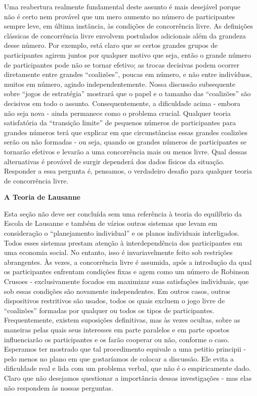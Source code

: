 \documentclass[a4paper,12pt]{article}[abntex2]
\begin{document}
Uma reabertura realmente fundamental deste assunto é mais desejável porque não é certo nem provável que um mero aumento no número de participantes sempre leve, em última instância, às condições de concorrência livre. As definições clássicas de concorrência livre envolvem postulados adicionais além da grandeza desse número. Por exemplo, está claro que se certos grandes grupos de participantes agirem juntos por qualquer motivo que seja, então o grande número de participantes pode não se tornar efetivo; as trocas decisivas podem ocorrer diretamente entre grandes “coalizões”, poucas em número, e não entre indivíduos, muitos em número, agindo independentemente. Nossa discussão subsequente sobre “jogos de estratégia” mostrará que o papel e o tamanho das “coalizões” são decisivos em todo o assunto. Consequentemente, a dificuldade acima - embora não seja nova - ainda permanece como o problema crucial. Qualquer teoria satisfatória da “transição limite” de pequenos números de participantes para grandes números terá que explicar em que circunstâncias essas grandes coalizões serão ou não formadas - ou seja, quando os grandes números de participantes se tornarão efetivos e levarão a uma concorrência mais ou menos livre. Qual dessas alternativas é provável de surgir dependerá dos dados físicos da situação. Responder a essa pergunta é, pensamos, o verdadeiro desafio para qualquer teoria de concorrência livre.

\textbf{A Teoria de Lausanne}

Esta seção não deve ser concluída sem uma referência à teoria do equilíbrio da Escola de Lausanne e também de vários outros sistemas que levam em consideração o “planejamento individual” e os planos individuais interligados. Todos esses sistemas prestam atenção à interdependência dos participantes em uma economia social. No entanto, isso é invariavelmente feito sob restrições abrangentes. Às vezes, a concorrência livre é assumida, após a introdução da qual os participantes enfrentam condições fixas e agem como um número de Robinson Crusoes - exclusivamente focados em maximizar suas satisfações individuais, que sob essas condições são novamente independentes. Em outros casos, outros dispositivos restritivos são usados, todos os quais excluem o jogo livre de “coalizões” formadas por qualquer ou todos os tipos de participantes. Frequentemente, existem suposições definitivas, mas às vezes ocultas, sobre as maneiras pelas quais seus interesses em parte paralelos e em parte opostos influenciarão os participantes e os farão cooperar ou não, conforme o caso. Esperamos ter mostrado que tal procedimento equivale a uma petitio principii - pelo menos no plano em que gostaríamos de colocar a discussão. Ele evita a dificuldade real e lida com um problema verbal, que não é o empiricamente dado. Claro que não desejamos questionar a importância dessas investigações - mas elas não respondem às nossas perguntas.
\end{document}
